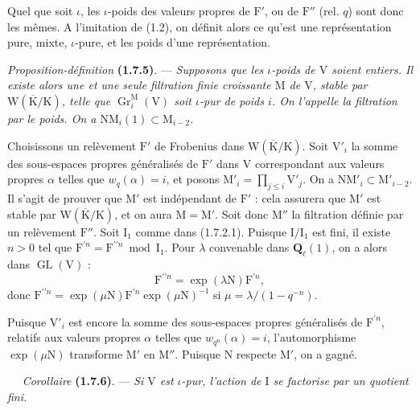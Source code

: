 \documentclass[11pt,leqno]{article}
\newcommand{\Page}[1]{\ifvmode\noindent\else\unskip\ \fi{\footnotesize\textcolor{gray}{[p.\,#1]}}\ \ignorespaces}
\begin{document}
Quel que soit \(\iota\), les \(\iota\)-poids des valeurs propres de \(\mathrm{F}'\), ou de \(\mathrm{F}''\) (rel. \(q\)) sont donc les mêmes. A l’imitation de (1.2), on définit alors ce qu’est une représentation pure, mixte, \(\iota\)-pure, et les poids d’une représentation.

\textit{Proposition-définition} \textbf{(1.7.5)}. — \textit{Supposons que les \(\iota\)-poids de \(\mathrm{V}\) soient entiers. Il existe alors une et une seule filtration finie croissante \(\mathrm{M}\) de \(\mathrm{V}\), stable par \(\mathrm{W}(\overline{\mathrm{K}}/\mathrm{K})\), telle que \(\operatorname{Gr}_i^{\mathrm{M}}(\mathrm{V})\) soit \(\iota\)-pur de poids \(i\). On l’appelle la \textup{filtration par le poids}. On a \(\mathrm{N}\mathrm{M}_i(1)\subset\mathrm{M}_{i-2}\).}

Choisissons un relèvement \(\mathrm{F}'\) de Frobenius dans \(\mathrm{W}(\overline{\mathrm{K}}/\mathrm{K})\). Soit \(\mathrm{V}'_i\) la somme des sous-espaces propres généralisés de \(\mathrm{F}'\) dans \(\mathrm{V}\) correspondant aux valeurs propres \(\alpha\) telles que \(w_q(\alpha)=i\), et posons \(\mathrm{M}'_i=\prod\limits_{j\leq i}\mathrm{V}'_j\). On a \(\mathrm{N}\mathrm{M}'_i\subset\mathrm{M}'_{i-2}\). Il s’agit de prouver que \(\mathrm{M}'\) est indépendant de \(\mathrm{F}'\) : cela assurera que \(\mathrm{M}'\) est stable par \(\mathrm{W}(\overline{\mathrm{K}}/\mathrm{K})\), et on aura \(\mathrm{M}=\mathrm{M}'\). Soit donc \(\mathrm{M}''\) la filtration définie par un relèvement \(\mathrm{F}''\). Soit \(\mathrm{I}_1\) comme dans (1.7.2.1). Puisque \(\mathrm{I}/\mathrm{I}_1\) est fini, il existe \(n>0\) tel que \(\mathrm{F}^{\prime n}=\mathrm{F}^{\prime\prime n}\bmod\mathrm{I}_1\). Pour \(\lambda\) convenable dans \(\mathbf{Q}_\ell(1)\), on a alors dans \(\operatorname{GL}(\mathrm{V})\) :
\[
\mathrm{F}^{\prime\prime n}=\exp(\lambda\mathrm{N})\mathrm{F}^{\prime n},
\]
donc \(\mathrm{F}^{\prime\prime n}=\exp(\mu\mathrm{N})\mathrm{F}^{\prime n}\exp(\mu\mathrm{N})^{-1}\) si \(\mu=\lambda/(1-q^{-n})\).

Puisque \(\mathrm{V}'_i\) est encore la somme des sous-espaces propres généralisés de \(\mathrm{F}^{\prime n}\), relatifs aux valeurs propres \(\alpha\) telles que \(w_{q^n}(\alpha)=i\), l’automorphisme \(\exp(\mu\mathrm{N})\) transforme \(\mathrm{M}'\) en \(\mathrm{M}''\). Puisque \(\mathrm{N}\) respecte \(\mathrm{M}'\), on a gagné.

\Page{172}
\textit{Corollaire} \textbf{(1.7.6)}. — \textit{Si \(\mathrm{V}\) est \(\iota\)-pur, l’action de \(\mathrm{I}\) se factorise par un quotient fini.}
\end{document}
